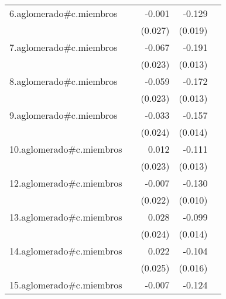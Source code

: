{\begin{longtable}{l*{4}{D{.}{.}{-1}}}
\addlinespace
6.aglomerado#c.miembros&                     &      -0.001         &      -0.129\sym{***}&                     \\
            &                     &     (0.027)         &     (0.019)         &                     \\
\addlinespace
7.aglomerado#c.miembros&                     &      -0.067\sym{**} &      -0.191\sym{***}&                     \\
            &                     &     (0.023)         &     (0.013)         &                     \\
\addlinespace
8.aglomerado#c.miembros&                     &      -0.059\sym{*}  &      -0.172\sym{***}&                     \\
            &                     &     (0.023)         &     (0.013)         &                     \\
\addlinespace
9.aglomerado#c.miembros&                     &      -0.033         &      -0.157\sym{***}&                     \\
            &                     &     (0.024)         &     (0.014)         &                     \\
\addlinespace
10.aglomerado#c.miembros&                     &       0.012         &      -0.111\sym{***}&                     \\
            &                     &     (0.023)         &     (0.013)         &                     \\
\addlinespace
12.aglomerado#c.miembros&                     &      -0.007         &      -0.130\sym{***}&                     \\
            &                     &     (0.022)         &     (0.010)         &                     \\
\addlinespace
13.aglomerado#c.miembros&                     &       0.028         &      -0.099\sym{***}&                     \\
            &                     &     (0.024)         &     (0.014)         &                     \\
\addlinespace
14.aglomerado#c.miembros&                     &       0.022         &      -0.104\sym{***}&                     \\
            &                     &     (0.025)         &     (0.016)         &                     \\
\addlinespace
15.aglomerado#c.miembros&                     &      -0.007         &      -0.124\sym{***}&                     \\

\end{longtable}}
